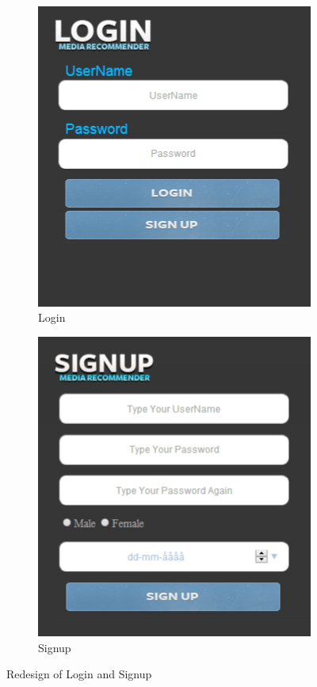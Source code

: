 \begin{figure}[H]
\centering
\begin{subfigure}{.5\textwidth}
  \centering
  \includegraphics[width=.9\linewidth]{Images/new-login.jpg}
  \caption{Login}
  \label{fig:new-login}
\end{subfigure}%
\begin{subfigure}{.5\textwidth}
  \centering
  \includegraphics[width=.9\linewidth]{Images/new-signup.jpg}
  \caption{Signup}
  \label{fig:new-signup}
\end{subfigure}
\caption{Redesign of Login and Signup}
\label{fig:login-signup}
\end{figure}



